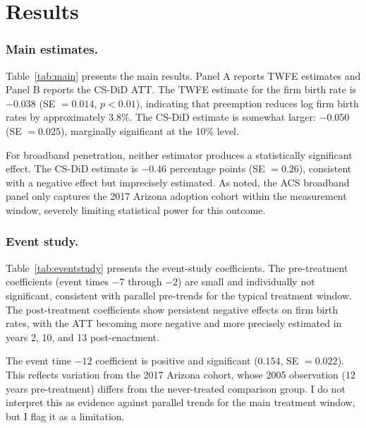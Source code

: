 \documentclass[12pt]{article}
\begin{document}

\section{Results}\label{sec:results}

\subsubsection*{Main estimates.} Table~\ref{tab:main} presents the main results. Panel A reports TWFE estimates and Panel B reports the CS-DiD ATT. The TWFE estimate for the firm birth rate is $-0.038$ (SE $= 0.014$, $p < 0.01$), indicating that preemption reduces log firm birth rates by approximately 3.8\%. The CS-DiD estimate is somewhat larger: $-0.050$ (SE $= 0.025$), marginally significant at the 10\% level.

For broadband penetration, neither estimator produces a statistically significant effect. The CS-DiD estimate is $-0.46$ percentage points (SE $= 0.26$), consistent with a negative effect but imprecisely estimated. As noted, the ACS broadband panel only captures the 2017 Arizona adoption cohort within the measurement window, severely limiting statistical power for this outcome.



\subsubsection*{Event study.} Table~\ref{tab:eventstudy} presents the event-study coefficients. The pre-treatment coefficients (event times $-7$ through $-2$) are small and individually not significant, consistent with parallel pre-trends for the typical treatment window. The post-treatment coefficients show persistent negative effects on firm birth rates, with the ATT becoming more negative and more precisely estimated in years 2, 10, and 13 post-enactment.

The event time $-12$ coefficient is positive and significant ($0.154$, SE $= 0.022$). This reflects variation from the 2017 Arizona cohort, whose 2005 observation (12 years pre-treatment) differs from the never-treated comparison group. I do not interpret this as evidence against parallel trends for the main treatment window, but I flag it as a limitation.
\end{document}

